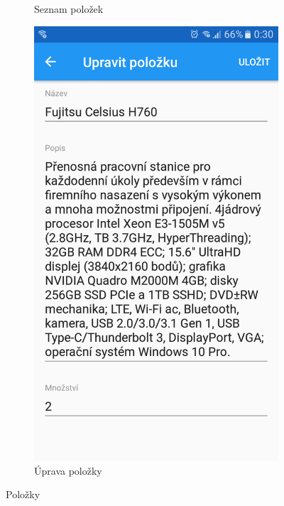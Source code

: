\documentclass[czech,BP]{thesiskiv}
\begin{document}
\begin{figure}[H]
\begin{subfigure}[b]{0.3\textwidth}
	\caption{Seznam položek}
	\label{fig:Screenshot_20170607-164919}
  \end{subfigure}
  \begin{subfigure}[b]{0.3\textwidth}
    \centering
	\includegraphics[width=\textwidth]{../images/client_android/Screenshot_20170612-003030.png}	
	\caption{Úprava položky}
	\label{fig:Screenshot_20170612-003030}
  \end{subfigure}
  \caption{Položky}
\end{figure}
\end{document}
